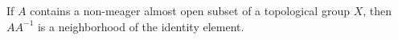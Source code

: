If $A$ contains a non-meager almost open subset of a topological group $X$, then $AA^{-1}$ is a neighborhood of the identity element.
